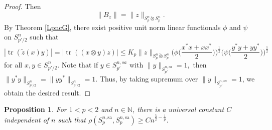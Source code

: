 \documentclass[a4paper,oneside,11pt, reqno]{amsart}
\numberwithin{equation}{section}
\newtheorem{proposition}[theorem]{Proposition}
\theoremstyle{plain}
\begin{document}
\begin{proof}
Then \[\|B_z\|=\|z\|_{S_p^{n}\check{\otimes}S_p^{n}}.\] 
By Theorem \ref{LpncG}, there exist positive unit norm linear functionals $\phi$ and $\psi$ on $S_{p'/2}^n$ such that 
\[|\operatorname{tr}(\widetilde{z}(x)y)|=|\operatorname{tr}((x\otimes y)z)|\leqslant K_p\|z\|_{S_p^{n}\check{\otimes}S_p^{n}}\bigg(\phi\Big(\frac{x^*x+xx^*}{2}\Big)\bigg)^{\frac{1}{2}}\bigg(\psi\Big(\frac{y^*y+yy^*}{2}\Big)\bigg)^{\frac{1}{2}}\] for all $x,y\in S_{p'/2}^n.$ 
Note that if $y\in S_{p'}^{n,sa}$ with $\|y\|_{S_{p'}^{n,sa}}=1,$ then $\|y^*y\|_{S_{p'/2}^{n}}=\|yy^*\|_{S_{p'/2}^{n}}=1.$ 
Thus, by taking supremum over $\|y\|_{S_{p'}^{n,sa}}=1$, we obtain the desired result.
\end{proof}

 \begin{proposition}\label{geqnclp}
     For  $1< p<2$ and $n\in\mathbb{N}$, there is a universal constant $C$ independent of $n$ such that  $\rho(S_p^{n,\text{sa}},S_p^{n,\text{sa}})\geqslant Cn^{\frac{5}{2}-\frac{1}{p}}.$
 \end{proposition}
\end{document}
